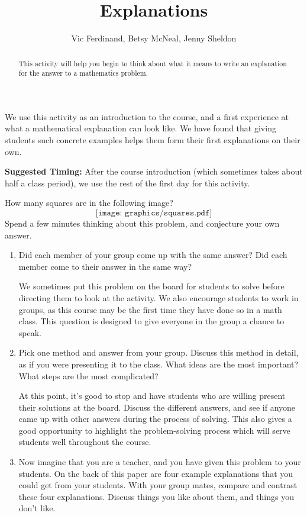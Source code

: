 \documentclass{ximera}
\title{Explanations}
\author{Vic Ferdinand, Betsy McNeal, Jenny Sheldon}
\begin{document}
\begin{abstract} 
This activity will help you begin to think about what it means to write an explanation for the answer to a mathematics problem. 
\end{abstract}
\maketitle

\begin{instructorIntro}
We use this activity as an introduction to the course, and a first experience at what a mathematical explanation can look like.  We have found that giving students such concrete examples helps them form their first explanations on their own.

{\bf Suggested Timing:} After the course introduction (which sometimes takes about half a class period), we use the rest of the first day for this activity.

\end{instructorIntro}

 How many squares are in the following image?
\[
\texttt{[image: graphics/squares.pdf]}
\]
Spend a few minutes thinking about this problem, and conjecture your own answer.  
\begin{enumerate}
\item Did each member of your group come up with the same answer?  Did each member come to their answer in the same way?
\begin{instructorNotes}
We sometimes put this problem on the board for students to solve before directing them to look at the activity.  We also encourage students to work in groups, as this course may be the first time they have done so in a math class.  This question is designed to give everyone in the group a chance to speak.
\end{instructorNotes}


\item
Pick one method and answer from your group.  Discuss this method in detail, as if you were presenting it to the class.  What ideas are the most important?  What steps are the most complicated?

\begin{instructorNotes}
At this point, it's good to stop and have students who are willing present their solutions at the board.  Discuss the different answers, and see if anyone came up with other answers during the process of solving.  This also gives a good opportunity to highlight the problem-solving process which will serve students well throughout the course.
\end{instructorNotes}


\item Now imagine that you are a teacher, and you have given this problem to your students.  On the back of this paper are four example explanations that you could get from your students.  With your group mates, compare and contrast these four explanations.  Discuss things you like about them, and things you don't like.
\end{enumerate}
\end{document}
